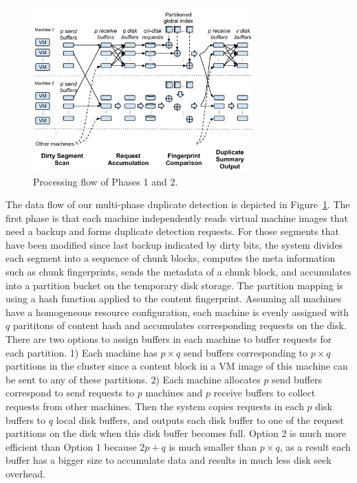 \begin{figure}[tbhp]
\centering
\includegraphics[width=0.75\textwidth]{steps.pdf}
\caption{Processing flow of Phases 1  and 2.}
\label{fig:flow}
\end{figure}

The data flow of our multi-phase duplicate detection is depicted in Figure~\ref{fig:flow}. 
The first phase is that each machine independently reads  
virtual machine images that need a backup
and forms duplicate  detection requests. For those segments that have been modified since last backup indicated by 
dirty bits,  the system divides  each segment into a sequence of chunk blocks,  computes the meta 
information such as chunk fingerprints,  sends the metadata of a chunk block, and accumulates  into 
a partition bucket on the temporary disk storage. 
The partition mapping is using a hash function applied to the content fingerprint. 
Assuming all machines have a  homogeneous resource configuration, each machine is evenly  assigned with
$q$ parititons of content hash and accumulates corresponding requests on the disk. 
There are two options to assign buffers in each machine to buffer requests for each partition.
1) Each machine has  $p\times q$ send buffers corresponding to $p\times q$ partitions in the cluster
since a content block in a VM image of this machine can be sent to any of these partitions.
2) Each machine allocates $p$ send buffers correspond to send requests to $p$ machines and 
$p$ receive buffers to collect requests  from other machines.
Then the system copies requests in each $p$ disk buffers to  $q$ local disk buffers,
and outputs each disk buffer to one of the request partitions on the disk
when this disk buffer becomes full.  Option 2 is much more efficient than Option 1 because $2p+q$ is much smaller than
$p\times q$, as a result each buffer has a bigger size to accumulate data and results in 
much less disk seek overhead.

